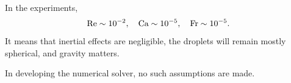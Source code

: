 \begin{frame}
\begin{columns}[T]
\begin{column}{0.4\textwidth}
      \pause
      \begin{flushleft}
        In the experiments, %
        \begin{equation} \notag
          \begin{aligned}
            \textrm{Re} \sim 10^{-2}, \quad
            \textrm{Ca} \sim 10^{-5}, \quad
            \textrm{Fr} \sim 10^{-5}.  
          \end{aligned}
        \end{equation}
        It means that inertial effects are negligible,
        the droplets will remain mostly spherical,
        and gravity matters.
        \vskip0.4cm

        \pause
        In developing the numerical solver, no such assumptions are made.
      \end{flushleft}
    \end{column}
    
  \end{columns}
  
\end{frame}

